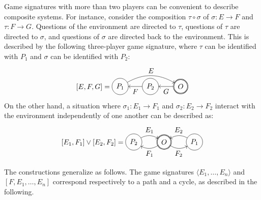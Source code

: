 \documentclass[format=sigplan,authordraft]{acmart}
\begin{document}
Game signatures with more than two players
can be convenient to describe composite systems.
For instance,
consider the composition $\tau \circ \sigma$
of $\sigma : E \rightarrow F$ and $\tau : F \rightarrow G$.
Questions of the environment are directed to $\tau$,
questions of $\tau$ are directed to $\sigma$,
and questions of $\sigma$ are directed back to the environment.
This is described by the following three-player game signature, where
$\tau$ can be identified with $P_1$ and
$\sigma$ can be identified with $P_2$:
\[
  [E,F,G] =
  \begin{tikzpicture}[baseline=(O.base),scale=1.5]
    \node[circle,double,draw] (O) at (1,0) {$O$};
    \node[circle,draw] (P2) at (0,0) {$P_2$};
    \node[circle,draw] (P1) at (-1,0) {$P_1$};
    \path[->] (O) edge node[below] {$G$} (P2);
    \path[->] (P2) edge node[below] {$F$} (P1);
    \path[->] (P1) edge[bend left] node[above] {$E$} (O);
  \end{tikzpicture}
\]
On the other hand,
a situation where
$\sigma_1 : E_1 \rightarrow F_1$ and
$\sigma_2 : E_2 \rightarrow F_2$
interact with the environment
independently of one another
can be described as:
\[
  [E_1,F_1] \vee [E_2,F_2] =
  \begin{tikzpicture}[baseline=(O.base),scale=1.5]
    \node[circle,draw] (P1) at (-1,0) {$P_2$};
    \node[circle,draw,double] (O) at (0,0) {$O$};
    \node[circle,draw] (P2) at (+1,0) {$P_1$};
    \path[->] (P1) edge[bend left] node[above] {$E_1$} (O);
    \path[->] (O) edge[bend left] node[below] {$F_1$} (P1);
    \path[->] (P2) edge[bend right] node[above] {$E_2$} (O);
    \path[->] (O) edge[bend right] node[below] {$F_2$} (P2);
  \end{tikzpicture}
\]

The constructions generalize as follows.
The game signatures
$\langle E_1, \ldots, E_n \rangle$ and
$[F, E_1, \ldots, E_n]$ 
correspond respectively to a path and a cycle,
as described in the following.
\end{document}
